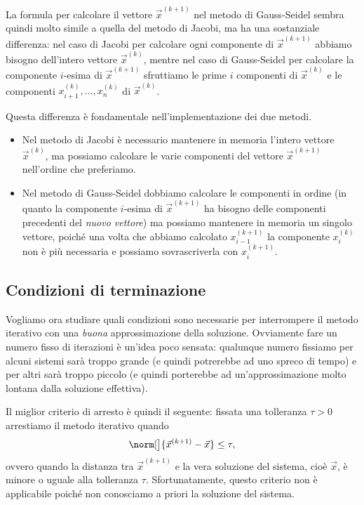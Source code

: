 La formula per calcolare il vettore $\vec x^{(k+1)}$ nel metodo di Gauss-Seidel sembra quindi molto simile a quella del metodo di Jacobi, ma ha una sostanziale differenza: 
nel caso di Jacobi per calcolare ogni componente di $\vec x^{(k+1)}$ abbiamo bisogno dell'intero vettore $\vec x^{(k)}$, mentre nel caso di Gauss-Seidel per calcolare la componente $i$-esima di $\vec x^{(k+1)}$ sfruttiamo le prime $i$ componenti di $\vec x^{(k)}$ e le componenti $x^{(k)}_{i+1}, \dots, x^{(k)}_n$ di $\vec x^{(k)}$. 

Questa differenza è fondamentale nell'implementazione dei due metodi. \begin{itemize}
    \item Nel metodo di Jacobi è necessario mantenere in memoria l'intero vettore $\vec x^{(k)}$, ma possiamo calcolare le varie componenti del vettore $\vec x^{(k+1)}$ nell'ordine che preferiamo.
    \item Nel metodo di Gauss-Seidel dobbiamo calcolare le componenti in ordine (in quanto la componente $i$-esima di $\vec x^{(k+1)}$ ha bisogno delle componenti precedenti del \emph{nuovo vettore}) ma possiamo mantenere in memoria un singolo vettore, poiché una volta che abbiamo calcolato $x^{(k+1)}_{i-1}$ la componente $x^{(k)}_i$ non è più necessaria e possiamo sovrascriverla con $x^{(k+1)}_i$. 
\end{itemize}

\subsection{Condizioni di terminazione}

Vogliamo ora studiare quali condizioni sono necessarie per interrompere il metodo iterativo con una \emph{buona} approssimazione della soluzione. Ovviamente fare un numero fisso di iterazioni è un'idea poco sensata: qualunque numero fissiamo per alcuni sistemi sarà troppo grande (e quindi potrerebbe ad uno spreco di tempo) e per altri sarà troppo piccolo (e quindi porterebbe ad un'approssimazione molto lontana dalla soluzione effettiva). 

Il miglior criterio di arresto è quindi il seguente: fissata una tolleranza $\tau > 0$ arrestiamo il metodo iterativo quando \[
    \norm[\big]{\vec x^{(k+1)} - \vec x} \leq \tau,
\] ovvero quando la distanza tra $\vec x^{(k+1)}$ e la vera soluzione del sistema, cioè $\vec x$, è minore o uguale alla tolleranza $\tau$. Sfortunatamente, questo criterio non è applicabile poiché non conosciamo a priori la soluzione del sistema.

